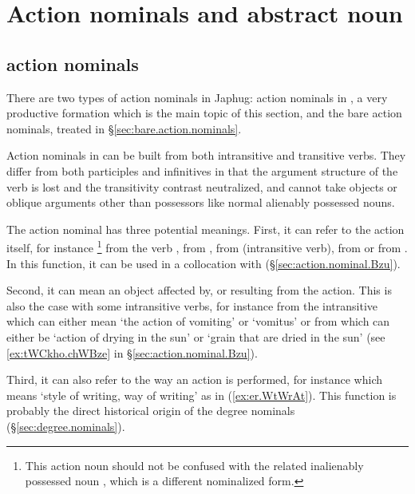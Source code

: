 \section{Action nominals and abstract noun} \label{sec:action.nominals}

\subsection{ action nominals} \label{sec:tW.action.nominal}
There are two types of action nominals in Japhug: action nominals in , a very productive formation which is the main topic of this section, and the bare action nominals, treated in §\ref{sec:bare.action.nominals}.

Action nominals in  can be built from both intransitive and transitive verbs. They differ from both participles and infinitives in that the argument structure of the verb is lost and the transitivity contrast neutralized, and cannot take objects or oblique arguments other than possessors like normal alienably possessed nouns.


The action nominal has three potential meanings.  First, it can refer to the action itself, for instance \footnote{This action noun should not be confused with the related inalienably possessed noun , which is a different nominalized form. } from the verb ,  from ,  from  (intransitive verb),  from  or  from . In this function, it can be used in a collocation with  (§\ref{sec:action.nominal.Bzu}).

Second, it can mean an object affected by, or resulting from the action. This is also the case with some intransitive verbs, for instance  from the intransitive  which can either mean `the action of vomiting' or `vomitus' or  from  which can either be `action of drying in the sun' or `grain that are dried in the sun' (see \ref{ex:tWCkho.chWBze} in §\ref{sec:action.nominal.Bzu}).

Third, it can also refer to the way an action is performed, for instance  which means `style of writing, way of writing' as in (\ref{ex:er.WtWrAt}). This function is probably the direct historical origin of the degree nominals (§\ref{sec:degree.nominals}).

